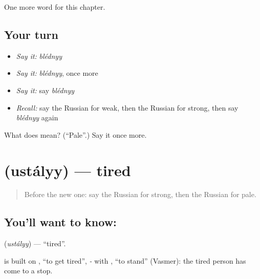 \begin{grammarlens}[title={What you've built}]
One more word for this chapter.
\end{grammarlens}

\subsection*{Your turn}
\begin{itemize}
\raggedright
  \item \emph{Say it:} \emph{blédnyy}
  \item \emph{Say it:} \emph{blédnyy}, once more
  \item \emph{Say it:} say \emph{blédnyy}
  \item \emph{Recall:} say the Russian for weak, then the Russian for strong, then say \emph{blédnyy} again
\end{itemize}

\begin{tcolorbox}[breakable,colback=teal!4,colframe=teal!35!black,title={Before you move on}]
What does  mean? (\textquotedblleft{}Pale\textquotedblright{}.) Say it once more.
\end{tcolorbox}
\section[\texorpdfstring{\ru{усталый} (ustályy)}{усталый (ustályy)}]{ (ustályy) — tired}

\label{lesson:RU-C148-ustalyy}



\begin{quote}
Before the new one: say the Russian for strong, then the Russian for pale.
\end{quote}

\subsection*{You'll want to know: }
\textbf{} (\emph{ustályy}) — \textquotedblleft{}tired\textquotedblright{}.

\begin{cousinweb}
\textbf{} is built on \emph{}, \textquotedblleft{}to get tired\textquotedblright{}, \emph{-} with \emph{}, \textquotedblleft{}to stand\textquotedblright{} (Vasmer): the tired person has come to a stop.
\end{cousinweb}

